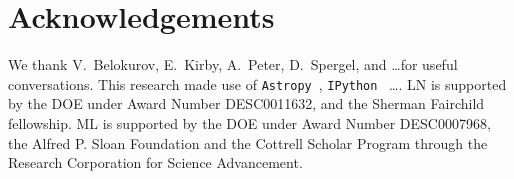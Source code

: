 \documentclass[twocolumn,preprintnumbers]{aastex6}
\newcommand{\zacc}{z_\mathrm{acc}}
\def\ML#1{\textcolor{red}{[ML: #1]}}
\begin{document}
%
%
%


\section*{Acknowledgements}
We thank V.~Belokurov, E.~Kirby, A.~Peter, D.~Spergel, and \ldots for useful conversations. This research made use of \texttt{Astropy}~\citep{2013A&A...558A..33A}, \texttt{IPython}~\citep{PER-GRA:2007} \ldots. LN is supported by the DOE under Award Number DESC0011632, and the Sherman Fairchild fellowship. ML is supported by the DOE under Award Number DESC0007968, the Alfred P. Sloan Foundation and the Cottrell Scholar Program through the Research Corporation for Science Advancement.
\end{document}

